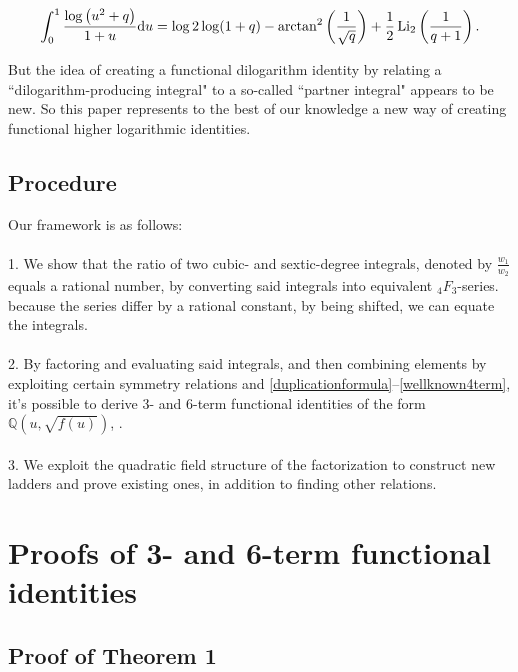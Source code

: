 \documentclass[12pt]{article}
\begin{document}
\begin{align}
\int_{0}^{1}\frac{\log\big(u^2+q\big)}{1+u}{\rm d}u=\log 2\log(1+q)-\arctan^2\left(\frac{1}{\sqrt{q}}\right)+\frac{1}{2}\operatorname{Li}_2\left(\frac{1}{q+1}\right).
\end{align}

\noindent But the idea of creating a functional dilogarithm identity by relating a ``dilogarithm-producing integral" to a so-called ``partner integral" appears to be new. So this paper represents  to the best of our knowledge a new way of creating functional higher logarithmic   identities. 



\subsection{Procedure}

Our framework is as follows:
\\
\\
1. We show that the ratio of two cubic- and sextic-degree integrals, denoted by $\frac{w_1}{w_2}$ equals a rational number, by converting  said integrals into equivalent ${}_{4}F_{3}$-series. because the series differ by a rational constant, by being shifted, we can equate the integrals.
\\
\\
2. By factoring and evaluating said integrals, and then combining elements by exploiting certain symmetry relations and \eqref{duplicationformula}--\eqref{wellknown4term}, it's possible to derive 3- and 6-term functional identities of the form $\mathbb{Q}(u,\sqrt{f(u)})$,  . 
\\
\\
3. We exploit the quadratic field structure of the factorization to construct new ladders and prove existing ones, in addition to finding other relations.


\section{Proofs of 3- and 6-term functional identities }\label{sectionsextic}

\subsection{Proof of Theorem 1}
\end{document}
